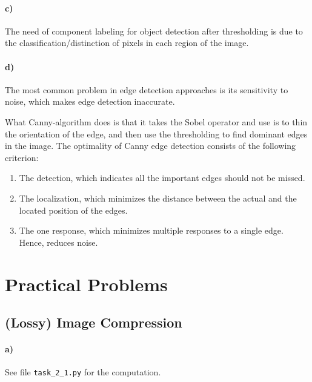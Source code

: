\documentclass[a4paper,twocolumn]{article}
\begin{document}
	\paragraph{c)} %
	
	The need of component labeling for object detection after thresholding is due to the classification/distinction of pixels in each region of the image.
	
	\paragraph{d)} %

	The most common problem in edge detection approaches is its sensitivity to noise, which makes edge detection inaccurate.
	
	What Canny-algorithm does is that it takes the Sobel operator and use is to thin the orientation of the edge, and then use the thresholding to find dominant edges in the image.
	The optimality of Canny edge detection consists of the following criterion:
	\begin{enumerate}
	\item The detection, which indicates all the important edges should not be missed.
	\item The localization, which minimizes the distance between the actual and the located position of the edges.
	\item The one response, which minimizes multiple responses to a single edge. Hence, reduces noise.
	\end{enumerate}
	
	
	\section{Practical Problems}
	
	\subsection{(Lossy) Image Compression}
	
	\paragraph{a)} See file \texttt{task\_2\_1.py} for the computation.
	
\end{document}
